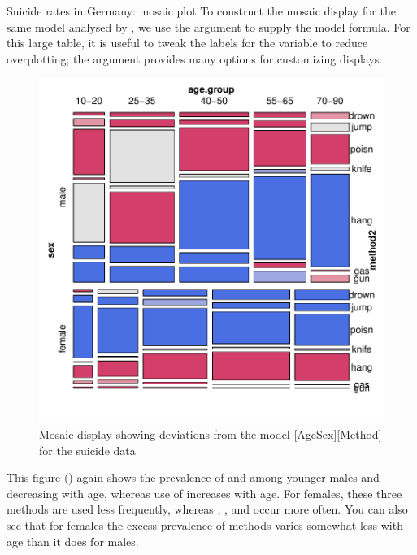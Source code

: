 \documentclass[11pt]{book}
\renewenvironment{knitrout}{\small\renewcommand{\baselinestretch}{.85}}{} %
\begin{document}
\begin{Example}[suicide2]{Suicide rates in Germany: mosaic plot}
To construct the mosaic display for the same model analysed by \ca, we use the 
argument  to supply the model formula.
For this large table, it is useful to tweak the labels for the 
variable to reduce overplotting; the  argument provides
many options for customizing  displays.
\begin{knitrout}
\color{fgcolor}\begin{kframe}
\begin{alltt}
 \hlstd{=}\hlstd{,} \hlstd{=}\hlstd{,}
       \hlstd{=}\hlopt{~}\hlopt{*} \hlopt{+} 
       \hlstd{=}\hlstd{(}\hlstd{=}\hlstd{(}\hlstd{,} \hlstd{,} \hlstd{)),}
                           \hlstd{=} \hlstd{(}\hlstd{,} \hlstd{,} \hlstd{,} \hlstd{))}
\end{alltt}
\end{kframe}\begin{figure}[!htb]


\centerline{\includegraphics[width=.7\textwidth]{ch06/fig/ca-suicide-mosaic} }

\caption[Mosaic display showing deviations from the model AgeSex Method for the suicide data]{Mosaic display showing deviations from the model [AgeSex][Method] for the suicide data\label{fig:ca-suicide-mosaic}}
\end{figure}


\end{knitrout}
This figure ()
again shows the prevalence of  and
 among younger males and decreasing with age, whereas use of 
increases with age.  
For females, these three methods are used less
frequently, whereas , , and  occur more often.
You can also see that for females the excess prevalence of methods varies somewhat
less with age than it does for males.

\end{Example}
\end{document}
